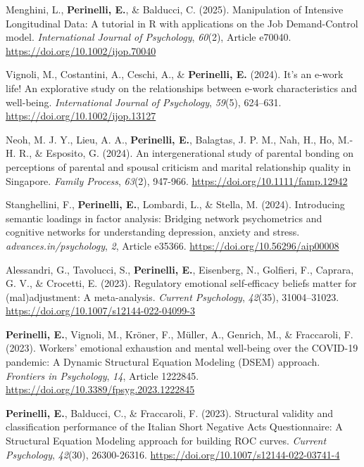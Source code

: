 \documentclass[hidelinks, letterpaper,10pt]{article} %
\begin{document}
\begin{etaremune}

\item Menghini, L., \textbf{Perinelli, E.}, \& Balducci, C. (2025). Manipulation of Intensive Longitudinal Data: A tutorial in R with applications on the Job Demand-Control model. \textit{International Journal of Psychology}, \textit{60}(2), Article e70040. \url{https://doi.org/10.1002/ijop.70040}

\item Vignoli, M., Costantini, A., Ceschi, A., \& \textbf{Perinelli, E.} (2024). It’s an e-work life! An explorative study on the relationships between e-work characteristics and well-being. \textit{International Journal of Psychology}, \textit{59}(5), 624–631. \url{https://doi.org/10.1002/ijop.13127}

\item Neoh, M. J. Y., Lieu, A. A., \textbf{Perinelli, E.}, Balagtas, J. P. M., Nah, H., Ho, M.-H. R., \& Esposito, G. (2024). An intergenerational study of parental bonding on perceptions of parental and spousal criticism and marital relationship quality in Singapore. \textit{Family Process}, \textit{63}(2), 947-966. \url{https://doi.org/10.1111/famp.12942}

\item Stanghellini, F., \textbf{Perinelli, E.}, Lombardi, L., \& Stella, M. (2024). Introducing semantic loadings in factor analysis: Bridging network psychometrics and cognitive networks for understanding depression, anxiety and stress. \textit{advances.in/psychology}, \textit{2}, Article e35366. \url{https://doi.org/10.56296/aip00008}

\item Alessandri, G., Tavolucci, S., \textbf{Perinelli, E.}, Eisenberg, N., Golfieri, F., Caprara, G. V., \& Crocetti, E. (2023). Regulatory emotional self-efficacy beliefs matter for (mal)adjustment: A meta-analysis. \textit{Current Psychology}, \textit{42}(35), 31004–31023. \url{https://doi.org/10.1007/s12144-022-04099-3}

\item \textbf{Perinelli, E.}, Vignoli, M., Kröner, F., Müller, A., Genrich, M., \& Fraccaroli, F. (2023). Workers' emotional exhaustion and mental well-being over the COVID-19 pandemic: A Dynamic Structural Equation Modeling (DSEM) approach. \textit{Frontiers in Psychology}, \textit{14}, Article 1222845. \url{https://doi.org/10.3389/fpsyg.2023.1222845}

\item \textbf{Perinelli, E.}, Balducci, C., \& Fraccaroli, F. (2023). Structural validity and classification performance of the Italian Short Negative Acts Questionnaire: A Structural Equation Modeling approach for building ROC curves. \textit{Current Psychology}, \textit{42}(30), 26300-26316. \url{https://doi.org/10.1007/s12144-022-03741-4}


\end{etaremune}
\end{document}
